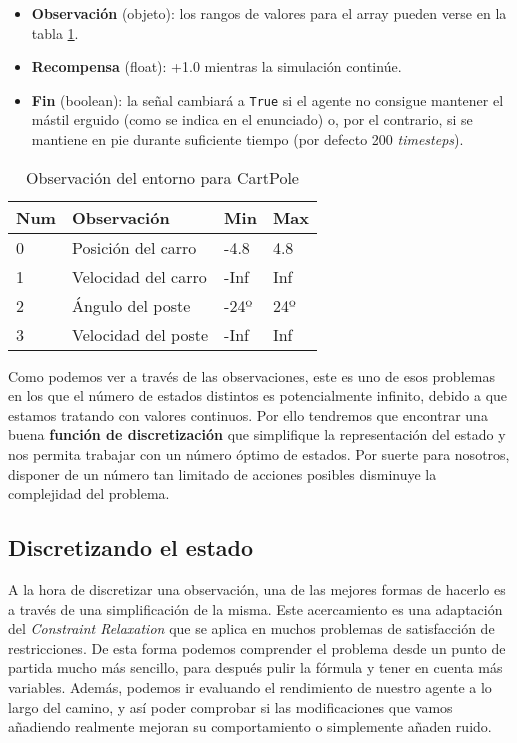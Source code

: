 \begin{itemize}
    \item \textbf{Observación} (objeto): los rangos de valores para el array pueden verse en la tabla \ref{obs-cartpole}.
    \item \textbf{Recompensa} (float): +1.0 mientras la simulación continúe.
    \item \textbf{Fin} (boolean): la señal cambiará a \texttt{True} si el agente no consigue mantener el mástil erguido (como se indica en el enunciado) o, por el contrario, si se mantiene en pie durante suficiente tiempo (por defecto 200 \textit{timesteps}).
\end{itemize}
\begin{table}[]
    \centering
    \begin{tabular}{|l|l|l|l|}
    \hline
    \textbf{Num} & \textbf{Observación} & \textbf{Min} & \textbf{Max} \\ \hline
    0            & Posición del carro   & -4.8         & 4.8          \\ \hline
    1            & Velocidad del carro  & -Inf         & Inf          \\ \hline
    2            & Ángulo del poste     & -24º         & 24º          \\ \hline
    3            & Velocidad del poste  & -Inf         & Inf          \\ \hline
    \end{tabular}
    \caption{Observación del entorno para CartPole}
    \label{obs-cartpole}
\end{table}

Como podemos ver a través de las observaciones, este es uno de esos problemas en los que el número de estados distintos es potencialmente infinito, debido a que estamos tratando con valores continuos. Por ello tendremos que encontrar una buena \textbf{función de discretización} que simplifique la representación del estado y nos permita trabajar con un número óptimo de estados. Por suerte para nosotros, disponer de un número tan limitado de acciones posibles disminuye la complejidad del problema.


\subsection{Discretizando el estado}
\label{sec:disc}

A la hora de discretizar una observación, una de las mejores formas de hacerlo es a través de una simplificación de la misma. Este acercamiento es una adaptación del \textit{Constraint Relaxation} \citep{rardin1998optimization} que se aplica en muchos problemas de satisfacción de restricciones. De esta forma podemos comprender el problema desde un punto de partida mucho más sencillo, para después pulir la fórmula y tener en cuenta más variables. Además, podemos ir evaluando el rendimiento de nuestro agente a lo largo del camino, y así poder comprobar si las modificaciones que vamos añadiendo realmente mejoran su comportamiento o simplemente añaden ruido.


